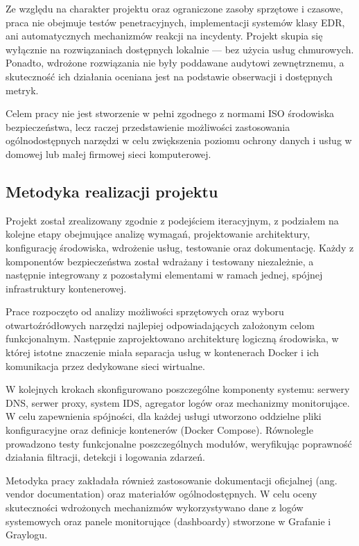 \documentclass[
    left=2.5cm,         %
    right=2.5cm,        %
    top=2.5cm,          %
    bottom=3cm,         %
    bindingoffset=6mm,  %
    nohyphenation=true %
]{eiti/eiti-thesis} %
\begin{document}
Ze względu na charakter projektu oraz ograniczone zasoby sprzętowe i czasowe, praca nie obejmuje testów penetracyjnych, implementacji systemów klasy EDR, ani automatycznych mechanizmów reakcji na incydenty. Projekt skupia się wyłącznie na rozwiązaniach dostępnych lokalnie — bez użycia usług chmurowych. Ponadto, wdrożone rozwiązania nie były poddawane audytowi zewnętrznemu, a skuteczność ich działania oceniana jest na podstawie obserwacji i dostępnych metryk.

Celem pracy nie jest stworzenie w pełni zgodnego z normami ISO środowiska bezpieczeństwa, lecz raczej przedstawienie możliwości zastosowania ogólnodostępnych narzędzi w celu zwiększenia poziomu ochrony danych i usług w domowej lub małej firmowej sieci komputerowej.

\subsection{Metodyka realizacji projektu}

Projekt został zrealizowany zgodnie z podejściem iteracyjnym, z podziałem na kolejne etapy obejmujące analizę wymagań, projektowanie architektury, konfigurację środowiska, wdrożenie usług, testowanie oraz dokumentację. Każdy z komponentów bezpieczeństwa został wdrażany i testowany niezależnie, a następnie integrowany z pozostałymi elementami w ramach jednej, spójnej infrastruktury kontenerowej.

Prace rozpoczęto od analizy możliwości sprzętowych oraz wyboru otwartoźródłowych narzędzi najlepiej odpowiadających założonym celom funkcjonalnym. Następnie zaprojektowano architekturę logiczną środowiska, w której istotne znaczenie miała separacja usług w kontenerach Docker i ich komunikacja przez dedykowane sieci wirtualne.

W kolejnych krokach skonfigurowano poszczególne komponenty systemu: serwery DNS, serwer proxy, system IDS, agregator logów oraz mechanizmy monitorujące. W celu zapewnienia spójności, dla każdej usługi utworzono oddzielne pliki konfiguracyjne\cite{github-homenetguardian} oraz definicje kontenerów (Docker Compose)\cite{lukaszfd_dockercompose2024}. Równolegle prowadzono testy funkcjonalne poszczególnych modułów, weryfikując poprawność działania filtracji, detekcji i logowania zdarzeń.

Metodyka pracy zakładała również zastosowanie dokumentacji oficjalnej (ang. vendor documentation) oraz materiałów ogólnodostępnych. W celu oceny skuteczności wdrożonych mechanizmów wykorzystywano dane z logów systemowych oraz panele monitorujące (dashboardy) stworzone w Grafanie i Graylogu.
\end{document}
